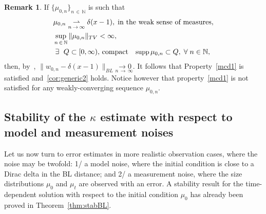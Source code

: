\documentclass[10pt]{amsart}
\theoremstyle{definition}\newtheorem{defi}[theo]{Definition}\newtheorem{rema}[theo]{Remark}\newtheorem{exam}[theo]{Example}\newtheorem{exem}[theo]{Example}\newtheorem{nota}[theo]{Notation}
\newcommand*\N{\mathbb{N}}
\newcommand*\supp{{\mbox{\small\rm supp}}\,}
\let\oldexists\exists
\renewcommand*{\exists}{\mathrel{\oldexists}}
\let\oldforall\forall
\renewcommand*{\forall}{\mathrel{\oldforall}}
\begin{document}
\begin{rema}
If $\{\mu _{0, n}\}_{n\,\in\,\N}$ is such that
\begin{equation*}
\begin{aligned}
& \mu _{0, n} \underset{n\,\to\,\infty}{ \rightharpoonup}\delta (x-1),\; \text{in the weak sense of measures},\\
&\sup_{n\,\in\,\N}\|\mu _{0, n}\|_{TV}<\infty,\\
&\exists\,\,Q\subset [0, \infty),\,\text{compact}\quad\supp \mu _{0, n}\subset Q,\; \forall n\in \N,
\end{aligned}
\end{equation*}
then, by~\cite[Proposition~4]{Hanin}, $\|w_{0, n}-\delta (x-1)\|_{BL}\underset{n\,\to\,\infty}{ \longrightarrow 0}$. It follows that Property~\eqref{mcd1} is satisfied and~\eqref{cor:generic2} holds. Notice however that property~\eqref{mcd1} is not satisfied for any weakly-converging sequence $\mu_{0,n}$.
\end{rema}



\subsection{Stability of the \texorpdfstring{$\kappa$}{kappa} estimate with respect to model and measurement noises}

Let us now turn to error estimates in more realistic observation cases, where the noise may be twofold:
1/ a model noise, where the initial condition is close to a Dirac delta in the BL distance;
and 2/ a measurement noise, where the size distributions $\mu_0$ and $\mu_t$ are observed with an error. A stability result for the time-dependent solution with respect to the initial condition $\mu _0$ has already been proved in Theorem~\ref{thm:stabBL}.

\end{document}
